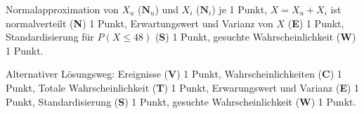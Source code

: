 \begin{bewertung}
Normalapproximation von $X_u$ ($\textbf{N}_u$) und $X_i$ ($\textbf{N}_i$)
je 1 Punkt,
$X=X_u+X_i$ ist normalverteilt ({\bf N}) 1 Punkt,
Erwartungswert und Varianz von $X$ ({\bf E}) 1 Punkt,
Standardisierung für $P(X\le 48)$ ({\bf S}) 1 Punkt,
gesuchte Wahrscheinlichkeit ({\bf W}) 1 Punkt.

Alternativer Lösungsweg: Ereignisse ({\bf V}) 1 Punkt,
Wahrscheinlichkeiten ({\bf C}) 1 Punkt,
Totale Wahrscheinlichkeit ({\bf T}) 1 Punkt,
Erwarungswert und Varianz ({\bf E}) 1 Punkt,
Standardisierung ({\bf S}) 1 Punkt,
gesuchte Wahrscheinlichkeit ({\bf W}) 1 Punkt.
\end{bewertung}

